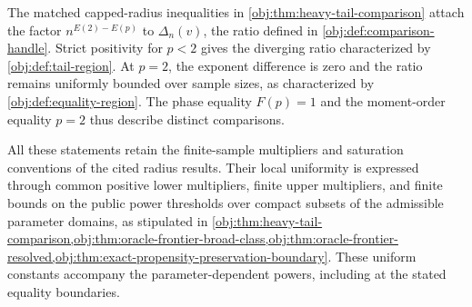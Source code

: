 The matched capped-radius inequalities in \cref{obj:thm:heavy-tail-comparison} attach the factor \(n^{E(2)-E(p)}\) to \(\Delta_n(v)\), the ratio defined in \cref{obj:def:comparison-handle}. Strict positivity for \(p<2\) gives the diverging ratio characterized by \cref{obj:def:tail-region}. At \(p=2\), the exponent difference is zero and the ratio remains uniformly bounded over sample sizes, as characterized by \cref{obj:def:equality-region}. The phase equality \(F(p)=1\) and the moment-order equality \(p=2\) thus describe distinct comparisons.

All these statements retain the finite-sample multipliers and saturation conventions of the cited radius results. Their local uniformity is expressed through common positive lower multipliers, finite upper multipliers, and finite bounds on the public power thresholds over compact subsets of the admissible parameter domains, as stipulated in \cref{obj:thm:heavy-tail-comparison,obj:thm:oracle-frontier-broad-class,obj:thm:oracle-frontier-resolved,obj:thm:exact-propensity-preservation-boundary}. These uniform constants accompany the parameter-dependent powers, including at the stated equality boundaries.

